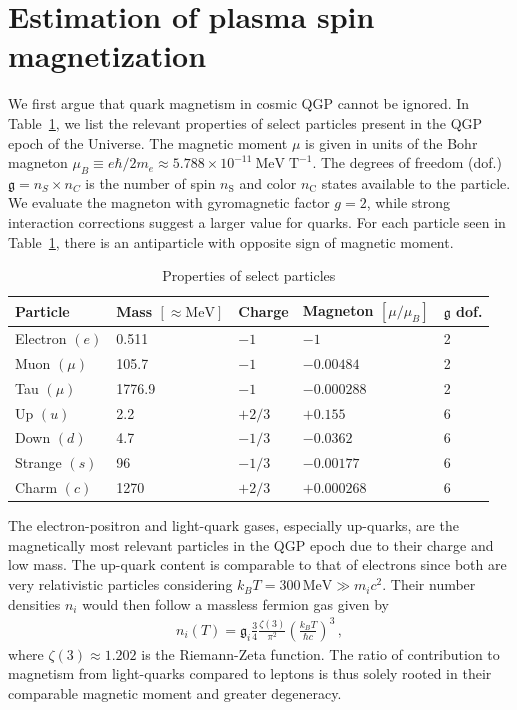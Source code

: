 \documentclass[epjST]{svjour}
\begin{document}
{\color{blue}\section{Estimation of plasma spin magnetization}
\label{sec:estimation}
}\noindent We first argue that quark magnetism in cosmic QGP cannot be ignored. In Table~\ref{tab:particle_properties}, we list the relevant properties of select particles present in the QGP epoch of the Universe. The magnetic moment \(\mu\) is given in units of the Bohr magneton \(\mu_{B}\equiv e\hbar/2m_{e}\approx5.788\times10^{-11}\ \mathrm{MeV\;T}^{-1}\). The degrees of freedom (dof.) \(\mathfrak{g}=n_{S}\times n_{C}\) is the number of spin \(n_\mathrm{S}\) and color \(n_\mathrm{C}\) states available to the particle. We evaluate the magneton with gyromagnetic factor \(g=2\), while strong interaction corrections suggest a larger value for quarks. For each particle seen in Table~\ref{tab:particle_properties}, there is an antiparticle with opposite sign of magnetic moment. 
\begin{table}[h]
\centering
\caption{Properties of select particles}
\label{tab:particle_properties}
\begin{tabular}{@{}lllll@{}}
\toprule
\textbf{Particle} & \textbf{Mass} \([\approx\mathrm{MeV}]\) & \textbf{Charge} & \textbf{Magneton} \([\mu/\mu_{B}]\) & \(\mathfrak{g}\) \textbf{dof.} \\ 
\midrule
Electron \((e)\) & 0.511 & \(-1\) & \(-1\) & 2 \\
Muon \((\mu)\) & 105.7 & \(-1\) & \(-0.00484\) & 2 \\
Tau \((\mu)\) & 1776.9 & \(-1\) & \(-0.000288\) & 2 \\
\midrule
Up \((u)\) & 2.2 & \(+2/3\) & \(+0.155\) & 6 \\
Down \((d)\) & 4.7 & \(-1/3\) & \(-0.0362\) & 6 \\
Strange \((s)\) & 96 & \(-1/3\) & \(-0.00177\) & 6 \\
Charm \((c)\) & 1270 & \(+2/3\) & \(+0.000268\) & 6 \\ 
\bottomrule
\end{tabular}
\end{table}

The electron-positron and light-quark gases, especially up-quarks, are the magnetically most relevant particles in the QGP epoch due to their charge and low mass. The up-quark content is comparable to that of electrons since both are very relativistic particles considering \(k_{B}T=300\,\mathrm{MeV}\gg m_i c^{2}\). Their number densities \(n_{i}\) would then follow a massless fermion gas given by
\begin{align}
\label{eq:NumberDensity}
n_{i}(T) = \mathfrak{g}_{i}\frac{3}{4}\frac{\zeta(3)}{\pi^{2}}\left(\frac{k_{B}T}{\hbar c}\right)^{3}\,,
\end{align}
where \(\zeta(3)\approx1.202\) is the Riemann-Zeta function. The ratio of contribution to magnetism from light-quarks compared to leptons is thus solely rooted in their comparable magnetic moment and greater degeneracy. 
\end{document}
